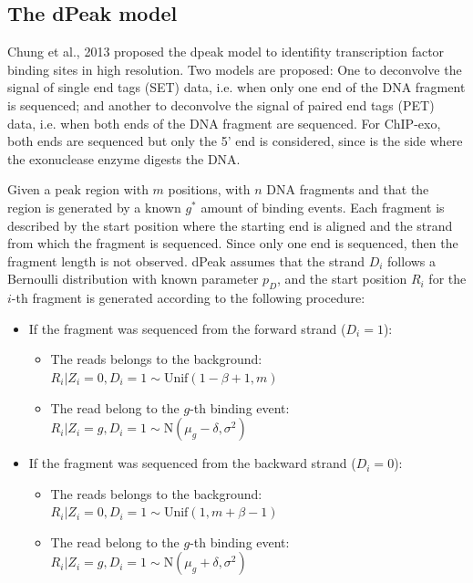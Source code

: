 \documentclass[11pt]{article}\usepackage[]{graphicx}\usepackage[]{color}
\begin{document}
\vspace*{\fill}

\subsection{The dPeak model}
\label{sec:dpeak}

Chung et al., 2013 proposed the dpeak model to identifity
transcription factor binding sites in high resolution. Two models are
proposed: One to deconvolve the signal of single end tags (SET) data,
i.e. when only one end of the DNA fragment is sequenced; and another
to deconvolve the signal of paired end tags (PET) data, i.e. when both
ends of the DNA fragment are sequenced. For ChIP-exo, both ends are
sequenced but only the 5' end is considered, since is the side where
the exonuclease enzyme digests the DNA.

Given a peak region with $m$ positions, with $n$ DNA fragments and that
the region is generated by a known $g^*$ amount of binding
events. Each fragment is described by the start position where the
starting end is aligned and the strand from which the fragment is
sequenced. Since only one end is sequenced, then the fragment length
is not observed. dPeak assumes that the strand $D_i$ follows a
Bernoulli distribution with known parameter $p_D$, and the start
position $R_i$ for the $i$-th fragment is generated according to the
following procedure:

\begin{itemize}
\item If the fragment was sequenced from the forward strand ($D_i =
  1$):
  \begin{itemize}
  \item The reads belongs to the background: $R_i | Z_i = 0, D_i = 1
    \sim \mbox{Unif}(1 - \beta + 1, m)$
  \item The read belong to the $g$-th binding event: $R_i | Z_i = g,
    D_i = 1 \sim \mbox{N}(\mu_g - \delta , \sigma^2)$
  \end{itemize}
\item If the fragment was sequenced from the backward strand ($D_i =
  0$):
  \begin{itemize}
  \item The reads belongs to the background: $R_i | Z_i = 0, D_i = 1
    \sim \mbox{Unif}(1 , m + \beta  - 1)$
  \item The read belong to the $g$-th binding event: $R_i | Z_i = g,
    D_i = 1 \sim \mbox{N}(\mu_g + \delta , \sigma^2)$
  \end{itemize}
  
\end{itemize}
\end{document}

